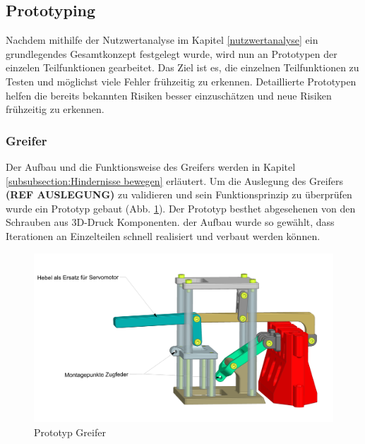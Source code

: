 \subsection{Prototyping}

Nachdem mithilfe der Nutzwertanalyse im Kapitel \ref{nutzwertanalyse} ein grundlegendes Gesamtkonzept festgelegt wurde, wird nun an Prototypen der einzelen Teilfunktionen gearbeitet. Das Ziel ist es, die einzelnen Teilfunktionen zu Testen und möglichst viele Fehler frühzeitig zu erkennen. Detaillierte Prototypen helfen die bereits bekannten Risiken besser einzuschätzen und neue Risiken frühzeitig zu erkennen.

\subsubsection{Greifer}
\label{subsubsection:Greifer}


Der Aufbau und die Funktionsweise des Greifers werden in Kapitel \ref{subsubsection:Hindernisse bewegen} erläutert. Um die Auslegung des Greifers \textbf{(REF AUSLEGUNG)} zu validieren und sein Funktionsprinzip zu überprüfen wurde ein Prototyp gebaut (Abb. \ref{fig:gripper-prototype-trimetric-notes}). Der Prototyp besthet abgesehenen von den Schrauben aus 3D-Druck Komponenten. der Aufbau wurde so gewählt, dass Iterationen an Einzelteilen schnell realisiert und verbaut werden können. 

\begin{figure}[H]
\centering
\includegraphics[width=1.0\textwidth]{assets/greifer-prototyp/Greifer_Trimetrisch_Notes.png}
\caption{Prototyp Greifer}
\label{fig:gripper-prototype-trimetric-notes}
\end{figure}

\newpage

